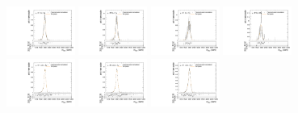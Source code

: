 \begin{figure}[htpb]
  \centering
  \includegraphics[width=0.2\textwidth]{fig/analysisAppendix/templateVsReco_GbuToWW2000_r0_MVV_mu_HP_bb_LDy_linear.pdf}
  \includegraphics[width=0.2\textwidth]{fig/analysisAppendix/templateVsReco_GbuToWW2000_r0_MVV_mu_LP_bb_LDy_linear.pdf}
  \includegraphics[width=0.2\textwidth]{fig/analysisAppendix/templateVsReco_GbuToWW2000_r0_MVV_mu_HP_bb_HDy_linear.pdf}
  \includegraphics[width=0.2\textwidth]{fig/analysisAppendix/templateVsReco_GbuToWW2000_r0_MVV_mu_LP_bb_HDy_linear.pdf}\\
  \includegraphics[width=0.2\textwidth]{fig/analysisAppendix/templateVsReco_GbuToWW2000_r0_MVV_mu_HP_nobb_LDy_linear.pdf}
  \includegraphics[width=0.2\textwidth]{fig/analysisAppendix/templateVsReco_GbuToWW2000_r0_MVV_mu_LP_nobb_LDy_linear.pdf}
  \includegraphics[width=0.2\textwidth]{fig/analysisAppendix/templateVsReco_GbuToWW2000_r0_MVV_mu_HP_nobb_HDy_linear.pdf}

\end{figure}

